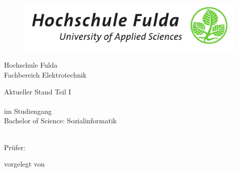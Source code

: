 \begin{titlepage}
\begin{figure}
  \centering
  \includegraphics[width=1.0\textwidth]{res/hs_fulda_logo.png}
\end{figure}
    \centering
    Hochschule Fulda \\    Fachbereich Elektrotechnik
    \vspace{1.5cm}

    {\Huge \bfseries \titel \par}
    {\Large \itshape \untertitel \par}
    \vspace{2.5cm}

    Aktueller Stand Teil I\\
    \modulname\\
    im Studiengang\\ Bachelor of Science: Sozialinformatik \\
    \vspace{0.7cm}

    \semester\\

    \vspace{3cm}
    Prüfer: \pruefer\\

    \vfill

    vorgelegt von \\ \beteiligte \\ \emailadresse 
\restoregeometry
\end{titlepage}
